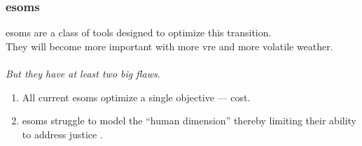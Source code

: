 \begin{frame}
    \frametitle{\glspl{esom}}
    \Glspl{esom} are a class of tools designed to 
    optimize this transition.
    \\

    They will become more important with more \gls{vre}
    and more volatile weather.
    \\\\
    \textit{But they have at least two big flaws}.
    \begin{enumerate}[<+->]
        \item All current \glspl{esom} optimize a single objective --- cost.
        \item \glspl{esom} struggle to model the ``human dimension'' thereby
        limiting their ability to address justice \cite{pfenninger_energy_2014}.
    \end{enumerate}
\end{frame}

